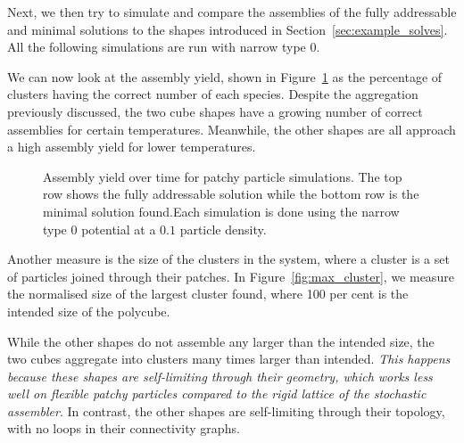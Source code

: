 Next, we then try to simulate and compare the assemblies of the fully addressable and minimal solutions to the shapes introduced in Section~\ref{sec:example_solves}. All the following simulations are run with narrow type 0.



We can now look at the assembly yield, shown in Figure~\ref{fig:complete_clusters} as the percentage of clusters having the correct number of each species. Despite the aggregation previously discussed, the two cube shapes have a growing number of correct assemblies for certain temperatures. Meanwhile, the other shapes are all approach a high assembly yield for lower temperatures.

\begin{figure}[ht]
    \centering
    \caption{Assembly yield over time for patchy particle simulations. The top row shows the fully addressable solution while the bottom row is the minimal solution found.Each simulation is done using the narrow type \(0\) potential at a \(0.1\) particle density.}
    \label{fig:complete_clusters}
\end{figure}

Another measure is the size of the clusters in the system, where a cluster is a set of particles joined through their patches. In Figure~\ref{fig:max_cluster}, we measure the normalised size of the largest cluster found, where 100 per cent is the intended size of the polycube. 

While the other shapes do not assemble any larger than the intended size, the two cubes aggregate into clusters many times larger than intended. \emph{This happens because these shapes are self-limiting through their geometry, which works less well on flexible patchy particles compared to the rigid lattice of the stochastic assembler}. In contrast, the other shapes are self-limiting through their topology, with no loops in their connectivity graphs.


